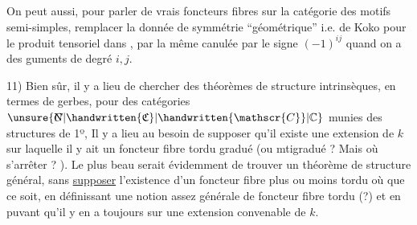 On peut aussi, pour parler de vrais foncteurs fibres sur la catégorie des motifs semi-simples, remplacer la donnée de symmétrie ``géométrique'' i.e. de Koko pour le produit tensoriel dans , par la même canulée par le signe $(-1)^{ij}$ quand on a des guments de degré $i,j$.

11) Bien sûr, il y a lieu de chercher des théorèmes de structure intrinsèques, en termes de gerbes, pour des catégories $\unsure{\rlap{\(\mathrm N\)}C|\handwritten{\mathfrak{C}}|\handwritten{\mathscr{C}}|\mathbb{C}}$ munies des structures de 1º, Il y a lieu au besoin de supposer qu'il existe une extension de $k$ sur laquelle il y ait un foncteur fibre tordu gradué (ou mtigradué ? Mais où s'arrêter ? ). Le plus beau serait évidemment de trouver un théorème de structure général, sans \uline{supposer} l'existence d'un foncteur fibre plus ou moins tordu où que ce soit, en définissant une notion assez générale de foncteur fibre tordu (?) et en puvant qu'il y en a toujours sur une extension convenable de $k$.
